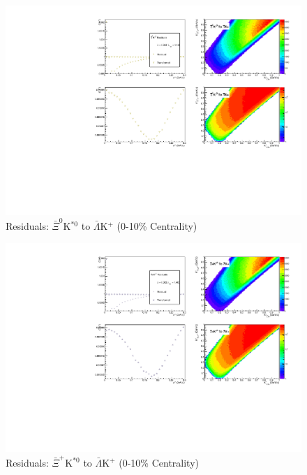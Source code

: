 \documentclass[../AnalysisNoteJBuxton.tex]{subfiles}
\begin{document}
\begin{figure}[h]
  \centering
  \includegraphics[width=\textwidth]{9_AdditionalFigures/Figures/Residuals/ALamKchP/Residuals_ALamKchP_0010_AXi0KSt0_MomResCrctn_NonFlatBgdCrctn_ResidualsIncluded_UsingCoulombOnlyInterpCfs.pdf}
  \caption[Residuals: $\bar{\Xi}^{0}$K$^{*0}$ to $\bar{\Lambda}$K$^{+}$ (0-10\% Centrality)]{Residuals: $\bar{\Xi}^{0}$K$^{*0}$ to $\bar{\Lambda}$K$^{+}$ (0-10\% Centrality)}
  \label{fig:Res_ALamKchP_0010_AXi0KSt0}
\end{figure}

\begin{figure}[h]
  \centering
  \includegraphics[width=\textwidth]{9_AdditionalFigures/Figures/Residuals/ALamKchP/Residuals_ALamKchP_0010_AXiKSt0_MomResCrctn_NonFlatBgdCrctn_ResidualsIncluded_UsingCoulombOnlyInterpCfs.pdf}
  \caption[Residuals: $\bar{\Xi}^{+}$K$^{*0}$ to $\bar{\Lambda}$K$^{+}$ (0-10\% Centrality)]{Residuals: $\bar{\Xi}^{+}$K$^{*0}$ to $\bar{\Lambda}$K$^{+}$ (0-10\% Centrality)}
  \label{fig:Res_ALamKchP_0010_AXiCKSt0}
\end{figure}
\end{document}
